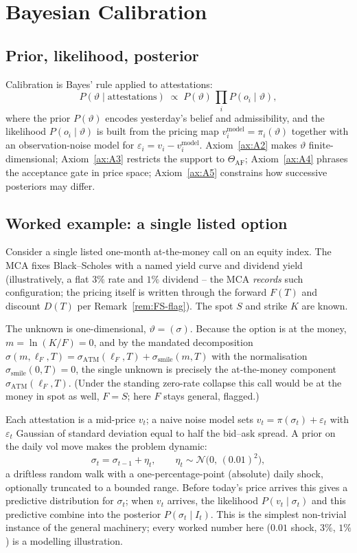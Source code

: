 \documentclass[11pt]{book}
\theoremstyle{plain}
\theoremstyle{definition}
\theoremstyle{remark}
\newcommand{\mln}{m}                             %
\newcommand{\lF}{\ell_F}                         %
\newcommand{\ssm}{\sigma_{\mathrm{smile}}}       %
\newcommand{\satm}{\sigma_{\mathrm{ATM}}}        %
\newcommand{\ncdf}{N}                            %
\newcommand{\Nrm}{\mathcal{N}}                   %
\newcommand{\parvec}{\vartheta}                  %
\begin{document}
\section{Bayesian Calibration}

\subsection{Prior, likelihood, posterior}

Calibration is Bayes' rule applied to attestations:
\[
    P(\parvec\mid\text{attestations})
    \;\propto\;
    P(\parvec)\,\prod_{i}P(o_i\mid\parvec),
\]
where the prior $P(\parvec)$ encodes yesterday's belief and admissibility, and the
likelihood $P(o_i\mid\parvec)$ is built from the pricing map
$v_i^{\text{model}}=\pi_i(\parvec)$ together with an observation-noise model for
$\varepsilon_i=v_i-v_i^{\text{model}}$. Axiom~\ref{ax:A2} makes $\parvec$
finite-dimensional; Axiom~\ref{ax:A3} restricts the support to
$\Theta_{\mathrm{AF}}$; Axiom~\ref{ax:A4} phrases the acceptance gate in price
space; Axiom~\ref{ax:A5} constrains how successive posteriors may differ.

\subsection{Worked example: a single listed option}

Consider a single listed one-month at-the-money call on an equity index. The MCA
fixes Black--Scholes with a named yield curve and dividend yield (illustratively,
a flat $3\%$ rate and $1\%$ dividend -- the MCA \emph{records} such configuration;
the pricing itself is written through the forward $F(T)$ and discount $D(T)$ per
Remark~\ref{rem:FS-flag}). The spot $S$ and strike $K$ are known.

The unknown is one-dimensional, $\parvec=(\sigma)$. Because the option is at the
money, $\mln=\ln(K/F)=0$, and by the mandated decomposition
$\sigma(\mln,\lF,T)=\satm(\lF,T)+\ssm(\mln,T)$ with the normalisation
$\ssm(0,T)=0$, the single unknown is precisely the at-the-money component
$\satm(\lF,T)$. (Under the standing zero-rate collapse this call would be at the
money in spot as well, $F=S$; here $F$ stays general, flagged.)

Each attestation is a mid-price $v_t$; a naive noise model sets
$v_t=\pi(\sigma_t)+\varepsilon_t$ with $\varepsilon_t$ Gaussian of standard
deviation equal to half the bid--ask spread. A prior on the daily vol move
makes the problem dynamic:
\[
    \sigma_t = \sigma_{t-1} + \eta_t,
    \qquad
    \eta_t \sim \Nrm\!\bigl(0,\,(0.01)^2\bigr),
\]
a driftless random walk with a one-percentage-point (absolute) daily shock,
optionally truncated to a bounded range. Before today's price arrives this gives a
predictive distribution for $\sigma_t$; when $v_t$ arrives, the likelihood
$P(v_t\mid\sigma_t)$ and this predictive combine into the posterior
$P(\sigma_t\mid I_t)$. This is the simplest non-trivial instance of the general
machinery; every worked number here ($0.01$ shock, $3\%$, $1\%$) is a
modelling illustration.
\end{document}
